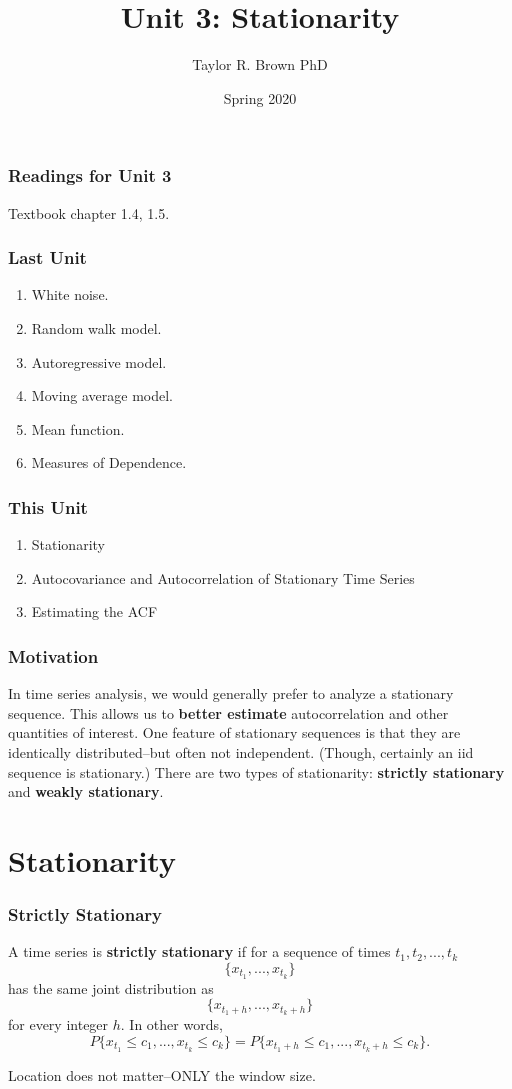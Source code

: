\documentclass[%
xcolor=pdftex]{beamer}
\title{Unit 3: Stationarity}
\author[STAT 5170: Applied Time Series, Unit 3]{Taylor R. Brown PhD}
\institute{Department of Statistics, University of Virginia}
\date{Spring 2020} %
\begin{document}
\frame{\titlepage}


\begin{frame}
\frametitle{Readings for Unit 3}

Textbook chapter 1.4, 1.5.

\end{frame}

\begin{frame}
\frametitle{Last Unit}
\begin{enumerate}
\item White noise.
\item Random walk model.
\item Autoregressive model.
\item Moving average model.
\item Mean function.
\item Measures of Dependence.
\end{enumerate}
\end{frame}

\begin{frame}
\frametitle{This Unit}
\begin{enumerate}
\item Stationarity
\item Autocovariance and Autocorrelation of Stationary Time Series
\item Estimating the ACF
\end{enumerate}
\end{frame}

\begin{frame}
\frametitle{Motivation}
In time series analysis, we would generally prefer to analyze a stationary sequence.  This allows us to \textbf{better estimate} autocorrelation and other quantities of interest.  One feature of stationary sequences is that they are identically distributed--but often not independent.  (Though, certainly an iid sequence is stationary.)  There are two types of stationarity: \textbf{strictly stationary} and \textbf{weakly stationary}.

\end{frame}


\section{Stationarity}
\frame{\tableofcontents[currentsection]}

\begin{frame}
\frametitle{Strictly Stationary}

A time series is \textbf{strictly stationary} if for a sequence of times $t_1, t_2,...,t_k$
$$
\{ x_{t_1},..., x_{t_k} \}
$$
has the same joint distribution as
$$
\{ x_{t_1+h},..., x_{t_k+h} \}
$$
for every integer $h$. In other words,
$$
P\{ x_{t_1}\leq c_1,..., x_{t_k} \leq c_k \}=P\{ x_{t_1+h}\leq c_1,..., x_{t_k+h}\leq c_k \}.
$$

Location does not matter--ONLY the window size.

\end{frame}
\end{document}
